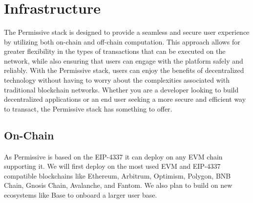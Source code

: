\documentclass{article}
\begin{document}
\section{Infrastructure}
\paragraph{}
The Permissive stack is designed to provide a seamless and secure user experience by utilizing both on-chain and off-chain computation. This approach allows for greater flexibility in the types of transactions that can be executed on the network, while also ensuring that users can engage with the platform safely and reliably. With the Permissive stack, users can enjoy the benefits of decentralized technology without having to worry about the complexities associated with traditional blockchain networks. Whether you are a developer looking to build decentralized applications or an end user seeking a more secure and efficient way to transact, the Permissive stack has something to offer. 
\subsection{On-Chain}
\paragraph{}
As Permissive is based on the EIP-4337 it can deploy on any EVM chain supporting it. We will first deploy on the most used EVM  and EIP-4337 compatible blockchains like Ethereum, Arbitrum, Optimism, Polygon, BNB Chain, Gnosis Chain, Avalanche, and Fantom. We also plan to build on new ecosystems like Base to onboard a larger user base.
\end{document}

